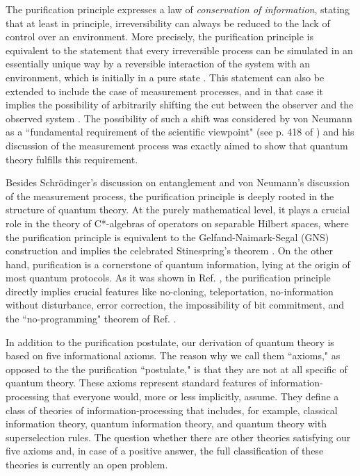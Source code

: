 \documentclass[12pt,aps,pra,showpacs,groupedaddress]{revtex4-1}
\begin{document}
The purification principle expresses a law of \emph{conservation of information}, stating that at
least in principle, irreversibility can always be reduced to the lack of control over an
environment. More precisely, the purification principle is equivalent to the statement that every
irreversible process can be simulated in an essentially unique way by a reversible interaction of
the system with an environment, which is initially in a pure state \cite{purification}.  This
statement can also be extended to include the case of measurement processes, and in that case it
implies the possibility of arbitrarily shifting the cut between the observer and the observed system
\cite{purification}.  The possibility of such a shift was considered by von Neumann as a
``fundamental requirement of the scientific viewpoint" (see p. 418 of \cite{von32}) and his
discussion of the measurement process was exactly aimed to show that quantum theory fulfills this
requirement.


Besides Schr\"odinger's discussion on entanglement and von Neumann's discussion of the measurement process, the purification principle is deeply rooted in
the structure of quantum theory.  At the purely mathematical level, it plays a crucial role in the
theory of C*-algebras of operators on separable Hilbert spaces, where the purification principle is
equivalent to the Gelfand-Naimark-Segal (GNS) construction \cite{arveson} and implies the celebrated
Stinespring's theorem \cite{stine}.  On the other hand, purification is a cornerstone of quantum information, lying at the origin of most
quantum protocols.  As it was shown in Ref. \cite{purification}, the purification 
principle directly implies crucial features like no-cloning, teleportation, no-information without
disturbance, error correction, the impossibility of bit commitment, and the ``no-programming"
theorem of Ref. \cite{no-prog}. 


In addition to the purification postulate, our derivation of quantum theory is based on five
informational axioms.  The reason why we call them ``axioms," as opposed to the the purification
``postulate," is that they are not at all specific of quantum theory.  These axioms represent 
standard features of information-processing that everyone would,
more or less implicitly, assume. They define a class of theories of information-processing 
that includes, for example, classical information theory, quantum information theory, and quantum theory with superselection rules.  The question 
whether there are other theories satisfying our five axioms  and, in case of a positive answer, the full classification of these theories is currently an open problem. 
\end{document}
